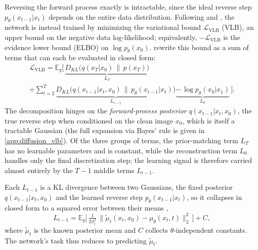 Reversing the forward process exactly is intractable, since the ideal reverse step $p_\theta(x_{t-1}|x_t)$ depends on the entire data distribution. Following \textcite{sohl2015thermo} and \textcite{ho_denoising_2020}, the network is instead trained by minimizing the variational bound $\mathcal{L}_{\mathrm{VLB}}$ (VLB), an upper bound on the negative data log-likelihood; equivalently, $-\mathcal{L}_{\mathrm{VLB}}$ is the evidence lower bound (ELBO) on $\log p_\theta(x_0)$. \textcite{ho_denoising_2020} rewrite this bound as a sum of terms that can each be evaluated in closed form:
\begin{multline}
\label{eq:vlb_decomposition}
    \mathcal{L}_{\mathrm{VLB}} = \mathbb{E}_q\Big[\, \underbrace{D_{KL}\!\big(q(x_T|x_0)\,\|\,p(x_T)\big)}_{L_T} \\
    + \sum_{t=2}^{T} \underbrace{D_{KL}\!\big(q(x_{t-1}|x_t,x_0)\,\|\,p_\theta(x_{t-1}|x_t)\big)}_{L_{t-1}} \underbrace{-\, \log p_\theta(x_0|x_1)}_{L_0} \,\Big].
\end{multline}
The decomposition hinges on the \emph{forward-process posterior} $q(x_{t-1}|x_t, x_0)$, the true reverse step when conditioned on the clean image $x_0$, which is itself a tractable Gaussian (the full expansion via Bayes' rule is given in \autoref{app:diffusion_vlb}). Of the three groups of terms, the prior-matching term $L_T$ has no learnable parameters and is constant, while the reconstruction term $L_0$ handles only the final discretization step; the learning signal is therefore carried almost entirely by the $T-1$ middle terms $L_{t-1}$.

Each $L_{t-1}$ is a KL divergence between two Gaussians, the fixed posterior $q(x_{t-1}|x_t,x_0)$ and the learned reverse step $p_\theta(x_{t-1}|x_t)$, so it collapses in closed form to a squared error between their means \parencite{ho_denoising_2020},
\begin{equation}
\label{eq:mean_mse}
    L_{t-1} = \mathbb{E}_q\Big[\, \tfrac{1}{2\sigma_t^2}\,\|\tilde{\mu}_t(x_t,x_0) - \mu_\theta(x_t,t)\|_2^2 \,\Big] + C,
\end{equation}
where $\tilde{\mu}_t$ is the known posterior mean and $C$ collects $\theta$-independent constants. The network's task thus reduces to predicting $\tilde{\mu}_t$.

